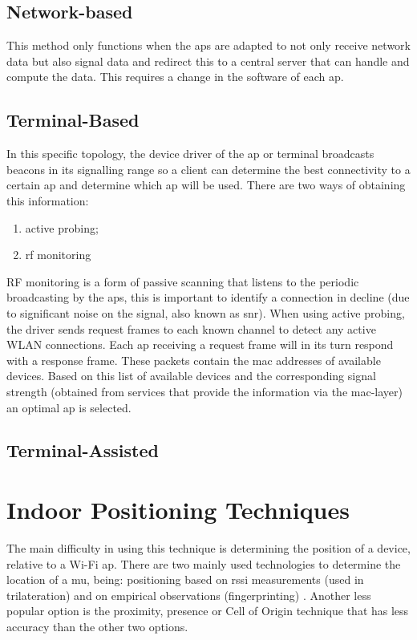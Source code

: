 \subsection{Network-based}
This method only functions when the \acrshort{ap}s are adapted to not only receive network data but also signal data and redirect this to a central server that can handle and compute the data. This requires a change in the software of each \acrlong{ap}.
\subsection{Terminal-Based}
In this specific topology, the device driver of the \acrshort{ap} or terminal broadcasts beacons in its signalling range so a client can determine the best connectivity to a certain \acrshort{ap} and determine which \acrshort{ap} will be used. There are two ways of obtaining this information: 
\begin{enumerate}
\item active probing;
\item \acrshort{rf} monitoring
\end{enumerate}
RF monitoring is a form of passive scanning that listens to the periodic broadcasting by the \acrlong{ap}s, this is important to identify a connection in decline (due to significant noise on the signal, also known as \acrfull{snr}). When using active probing, the driver sends request frames to each known channel to detect any active WLAN connections. Each \acrshort{ap} receiving a request frame will in its turn respond with a response frame. These packets contain the \acrshort{mac} addresses of available devices. Based on this list of available devices and the corresponding signal strength (obtained from services that provide the information via the \acrshort{mac}-layer) an optimal \acrshort{ap} is selected\cite[p.~8]{Retscher}.
\subsection{Terminal-Assisted}
\section{Indoor Positioning Techniques}
The main difficulty in using this technique is determining the position of a device, relative to a Wi-Fi \acrfull{ap}. There are two mainly used technologies to determine the location of a \acrfull{mu}, being: positioning based on \acrshort{rssi} measurements (used in trilateration) and on empirical observations (fingerprinting) \cite{Frank2009}. Another less popular option is the proximity, presence or Cell of Origin technique that has less accuracy than the other two options.
